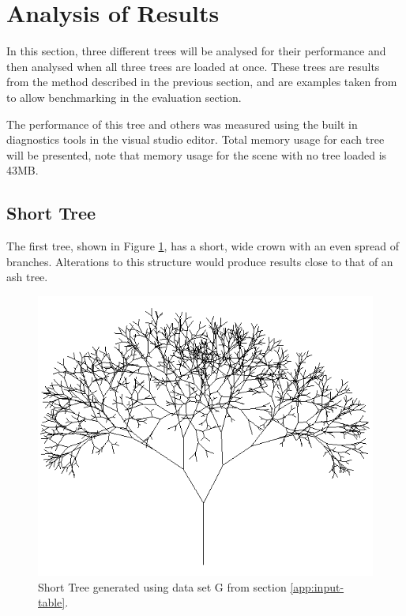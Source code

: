 \documentclass[final]{cmpreport}
\begin{document}
\section{Analysis of Results}
In this section, three different trees will be analysed for their performance and then analysed 
when all three trees are loaded at once. These trees are results from the method described in 
the previous section, and are examples taken from \cite{prusinkiewicz1996systems} to allow 
benchmarking in the evaluation section.

The performance of this tree and others was measured using the built in diagnostics tools in 
the visual studio editor. Total memory usage for each tree will be presented, note that memory 
usage for the scene with no tree loaded is 43MB.

\subsection{Short Tree}
The first tree, shown in Figure \ref{fig:tree-g}, has a short, wide crown with an even spread of branches.
Alterations to this structure would produce results close to that of an ash tree. 

\begin{figure}[ht]
    \includegraphics[scale=0.7]{tree-g.PNG} 
    \centering
    \captionsetup{justification=centering}
    \caption{Short Tree generated using data set G from section \ref{app:input-table}.}
    \label{fig:tree-g}
\end{figure}
\end{document}
